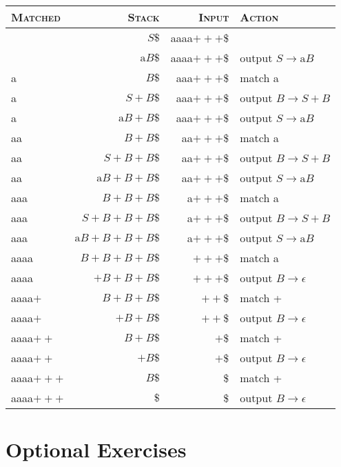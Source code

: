 \documentclass{CompilerAssignment}
\newcommand{\rma}{\mathrm{a}}
\begin{document}
\begin{enumerate}
\begin{center}
        \begin{tabular}{lrrl}
            \hline \hline
            \textsc{Matched} & \textsc{Stack} & \textsc{Input} & \textsc{Action} \\ \hline
            & $S\$$ & aaaa$+++$\$ & \\
            & $\rma B\$$ & aaaa$+++$\$ & output $S \rightarrow \rma B$ \\
            a & $B\$$ & aaa$+++$\$ & match a \\
            a & $S + B\$$ & aaa$+++$\$ & output $B \rightarrow S + B$ \\
            a & $\rma B + B\$$ & aaa$+++$\$ & output $S \rightarrow \rma B$ \\
            aa & $B + B\$$ & aa$+++$\$ & match a \\
            aa & $S + B + B\$$ & aa$+++$\$ & output $B \rightarrow S + B$ \\
            aa & $\rma B + B + B\$$ & aa$+++$\$ & output $S \rightarrow \rma B$ \\
            aaa & $B + B + B\$$ & a$+++$\$ & match a \\
            aaa & $S + B + B + B\$$ & a$+++$\$ & output $B \rightarrow S + B$ \\
            aaa & $\rma B + B + B + B\$$ & a$+++$\$ & output $S \rightarrow \rma B$ \\
            aaaa & $B + B + B + B\$$ & $+++$\$ & match a \\
            aaaa & $+ B + B + B\$$ & $+++$\$ & output $B \rightarrow \epsilon$ \\
            aaaa$+$ & $B + B + B\$$ & $++$\$ & match + \\
            aaaa$+$ & $+ B + B\$$ & $++$\$ & output $B \rightarrow \epsilon$ \\
            aaaa$++$ & $B + B\$$ & $+$\$ & match + \\
            aaaa$++$ & $+ B\$$ & $+$\$ & output $B \rightarrow \epsilon$ \\
            aaaa$+++$ & $B\$$ & \$ & match + \\
            aaaa$+++$ & $\$$ & \$ & output $B \rightarrow \epsilon$ \\ \hline
        \end{tabular}
    \end{center}
\end{enumerate}

\section{Optional Exercises}
\end{document}
